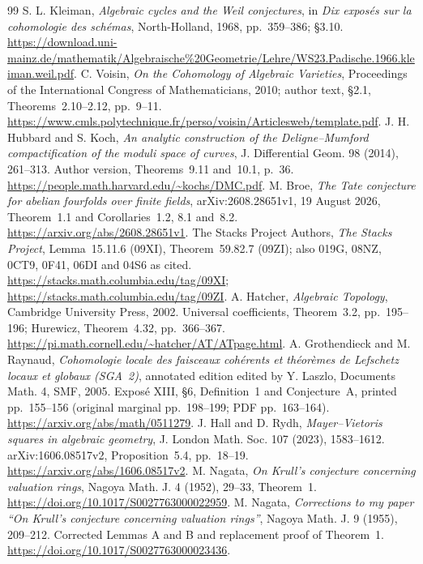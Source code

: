 \documentclass[11pt,a4paper]{article}
\theoremstyle{definition}
\begin{document}
\begin{thebibliography}{99}
 S. L. Kleiman, \emph{Algebraic cycles and the Weil conjectures}, in \emph{Dix expos\'es sur la cohomologie des sch\'emas}, North-Holland, 1968, pp.~359--386; \S3.10. \url{https://download.uni-mainz.de/mathematik/Algebraische%20Geometrie/Lehre/WS23.Padische.1966.kleiman.weil.pdf}.
 C. Voisin, \emph{On the Cohomology of Algebraic Varieties}, Proceedings of the International Congress of Mathematicians, 2010; author text, \S2.1, Theorems~2.10--2.12, pp.~9--11. \url{https://www.cmls.polytechnique.fr/perso/voisin/Articlesweb/template.pdf}.
 J. H. Hubbard and S. Koch, \emph{An analytic construction of the Deligne--Mumford compactification of the moduli space of curves}, J. Differential Geom. 98 (2014), 261--313. Author version, Theorems~9.11 and~10.1, p.~36. \url{https://people.math.harvard.edu/~kochs/DMC.pdf}.
 M. Broe, \emph{The Tate conjecture for abelian fourfolds over finite fields}, arXiv:2608.28651v1, 19 August 2026, Theorem~1.1 and Corollaries~1.2, 8.1 and~8.2. \url{https://arxiv.org/abs/2608.28651v1}.
 The Stacks Project Authors, \emph{The Stacks Project}, Lemma~15.11.6 (09XI), Theorem~59.82.7 (09ZI); also 019G, 08NZ, 0CT9, 0F41, 06DI and 04S6 as cited. \url{https://stacks.math.columbia.edu/tag/09XI}; \url{https://stacks.math.columbia.edu/tag/09ZI}.
 A. Hatcher, \emph{Algebraic Topology}, Cambridge University Press, 2002. Universal coefficients, Theorem~3.2, pp.~195--196; Hurewicz, Theorem~4.32, pp.~366--367. \url{https://pi.math.cornell.edu/~hatcher/AT/ATpage.html}.
 A. Grothendieck and M. Raynaud, \emph{Cohomologie locale des faisceaux coh\'erents et th\'eor\`emes de Lefschetz locaux et globaux (SGA~2)}, annotated edition edited by Y. Laszlo, Documents Math. 4, SMF, 2005. Expos\'e XIII, \S6, Definition~1 and Conjecture~A, printed pp.~155--156 (original marginal pp.~198--199; PDF pp.~163--164). \url{https://arxiv.org/abs/math/0511279}.
 J. Hall and D. Rydh, \emph{Mayer--Vietoris squares in algebraic geometry}, J. London Math. Soc. 107 (2023), 1583--1612. arXiv:1606.08517v2, Proposition~5.4, pp.~18--19. \url{https://arxiv.org/abs/1606.08517v2}.
 M. Nagata, \emph{On Krull's conjecture concerning valuation rings}, Nagoya Math. J. 4 (1952), 29--33, Theorem~1. \url{https://doi.org/10.1017/S0027763000022959}.
 M. Nagata, \emph{Corrections to my paper ``On Krull's conjecture concerning valuation rings''}, Nagoya Math. J. 9 (1955), 209--212. Corrected Lemmas A and B and replacement proof of Theorem~1. \url{https://doi.org/10.1017/S0027763000023436}.

\end{thebibliography}
\end{document}

